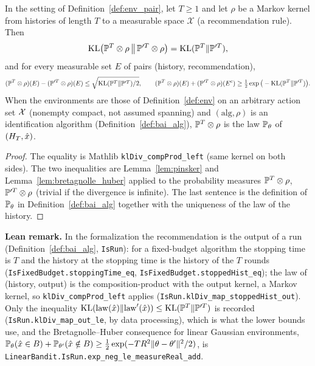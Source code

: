 \begin{lemma}
\label{lem:kl_data_processing_recommendation}
\leanok
{}
In the setting of Definition~\ref{def:env_pair}, let $T \ge 1$ and let $\rho$ be a Markov
kernel from histories of length $T$ to a measurable space $\mathcal{X}$ (a recommendation rule).
Then
\[
  \mathrm{KL}\big(\mathbb{P}^T\otimes\rho\,\big\|\,\mathbb{P}'^T\otimes\rho\big) = \mathrm{KL}(\mathbb{P}^T\|\mathbb{P}'^T),
\]
and for every measurable set $E$ of pairs (history, recommendation),
\[
  (\mathbb{P}^T\otimes\rho)(E) - (\mathbb{P}'^T\otimes\rho)(E) \le \sqrt{\mathrm{KL}(\mathbb{P}^T\|\mathbb{P}'^T)/2},
  \qquad
  (\mathbb{P}^T\otimes\rho)(E) + (\mathbb{P}'^T\otimes\rho)(E^c) \ge \tfrac12\exp\big(-\mathrm{KL}(\mathbb{P}^T\|\mathbb{P}'^T)\big).
\]
When the environments are those of Definition~\ref{def:env} on an arbitrary action set
$\mathcal{X}$ (nonempty compact, not assumed spanning) and $(\mathrm{alg},\rho)$ is an
identification algorithm (Definition~\ref{def:bai_alg}), $\mathbb{P}^T\otimes\rho$ is the law
$\mathbb{P}_\theta$ of $(H_T,\hat{x})$.
\end{lemma}

\begin{proof}
\leanok
{}
The equality is Mathlib \texttt{klDiv\_compProd\_left} (same kernel on both sides). The two
inequalities are Lemma~\ref{lem:pinsker} and Lemma~\ref{lem:bretagnolle_huber} applied to the
probability measures $\mathbb{P}^T\otimes\rho$, $\mathbb{P}'^T\otimes\rho$ (trivial if the divergence is
infinite). The last sentence is the definition of $\mathbb{P}_\theta$ in
Definition~\ref{def:bai_alg} together with the uniqueness of the law of the history.
\end{proof}

\textbf{Lean remark.} In the formalization the recommendation is the output of a run
(Definition~\ref{def:bai_alg}, \texttt{IsRun}): for a fixed-budget algorithm the stopping time is
$T$ and the history at the stopping time is the history of the $T$ rounds
(\texttt{IsFixedBudget.stoppingTime\_eq}, \texttt{IsFixedBudget.stoppedHist\_eq}); the law of
(history, output) is the composition-product with the output kernel, a Markov kernel, so
\texttt{klDiv\_compProd\_left} applies (\texttt{IsRun.klDiv\_map\_stoppedHist\_out}). Only the
inequality
$\mathrm{KL}(\mathrm{law}(\hat{x})\|\mathrm{law}'(\hat{x})) \le \mathrm{KL}(\mathbb{P}^T\|\mathbb{P}'^T)$ is recorded
(\texttt{IsRun.klDiv\_map\_out\_le}, by data processing), which is what the lower bounds use, and
the Bretagnolle--Huber consequence for linear Gaussian environments,
$\mathbb{P}_\theta(\hat{x}\in B) + \mathbb{P}_{\theta'}(\hat{x}\notin B) \ge \tfrac12\exp(-TR^2\lVert \theta-\theta' \rVert^2/2)$,
is \texttt{LinearBandit.IsRun.exp\_neg\_le\_measureReal\_add}.

